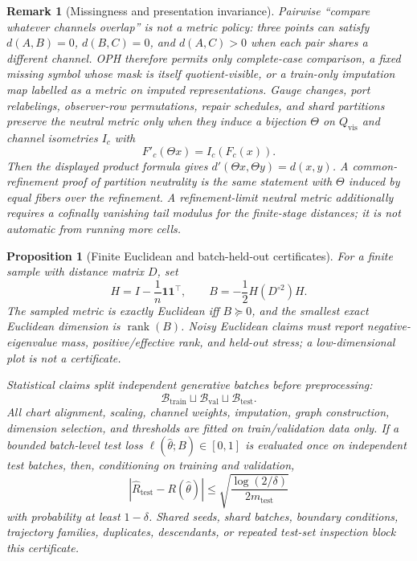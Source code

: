 \documentclass[11pt]{article}
\newtheorem{proposition}[theorem]{Proposition}
\newtheorem{remark}[theorem]{Remark}
\begin{document}
\begin{remark}[Missingness and presentation invariance]\label{rem:neutral-missingness-invariance}
Pairwise ``compare whatever channels overlap'' is not a metric policy: three points can satisfy
\(d(A,B)=0\), \(d(B,C)=0\), and \(d(A,C)>0\) when each pair shares a different channel. OPH
therefore permits only complete-case comparison, a fixed missing symbol whose mask is itself
quotient-visible, or a train-only imputation map labelled as a metric on imputed
representations. Gauge changes, port relabelings, observer-row permutations, repair schedules,
and shard partitions preserve the neutral metric only when they induce a bijection
\(\Theta\) on \(Q_{\mathrm{vis}}\) and channel isometries \(I_c\) with
\[
F'_c(\Theta x)=I_c(F_c(x)).
\]
Then the displayed product formula gives \(d'(\Theta x,\Theta y)=d(x,y)\). A common-refinement
proof of partition neutrality is the same statement with \(\Theta\) induced by equal fibers over
the refinement. A refinement-limit neutral metric additionally requires a cofinally vanishing
tail modulus for the finite-stage distances; it is not automatic from running more cells.
\end{remark}

\begin{proposition}[Finite Euclidean and batch-held-out certificates]\label{prop:neutral-euclidean-stat-cert}
For a finite sample with distance matrix \(D\), set
\[
H=I-\frac1n\mathbf 1\mathbf 1^\top,\qquad
B=-\frac12H(D^{\circ2})H .
\]
The sampled metric is exactly Euclidean iff \(B\succeq0\), and the smallest exact Euclidean
dimension is \(\operatorname{rank}(B)\). Noisy Euclidean claims must report negative-eigenvalue
mass, positive/effective rank, and held-out stress; a low-dimensional plot is not a certificate.

Statistical claims split independent generative batches before preprocessing:
\[
\mathcal B_{\mathrm{train}}\sqcup\mathcal B_{\mathrm{val}}\sqcup\mathcal B_{\mathrm{test}}.
\]
All chart alignment, scaling, channel weights, imputation, graph construction, dimension
selection, and thresholds are fitted on train/validation data only. If a bounded batch-level test
loss \(\ell(\widehat\theta;B)\in[0,1]\) is evaluated once on independent test batches, then,
conditioning on training and validation,
\[
\left|
\widehat R_{\mathrm{test}}-R(\widehat\theta)
\right|
\le
\sqrt{\frac{\log(2/\delta)}{2m_{\mathrm{test}}}}
\]
with probability at least \(1-\delta\). Shared seeds, shard batches, boundary conditions,
trajectory families, duplicates, descendants, or repeated test-set inspection block this
certificate.
\end{proposition}
\end{document}
